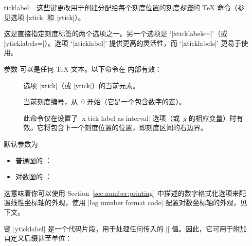 \begin{pgfplotsxykey}{\x ticklabel=}
    这些键更改用于创建分配给每个刻度位置的刻度\emph{标签}的 \TeX{} 命令（参见选项 |xtick| 和 |ytick|）。

    这是直接指定刻度标签的两个选项之一。另一个选项是 `|xticklabels=|'（或 |yticklabels=|）。选项 `|xticklabel|' 提供更高的灵活性，而 `|xticklabels|' 更易于使用。

    参数  可以是任何 \TeX{} 文本。以下命令在  内部有效：
    \begin{description}
        \item[] \declareandlabel{\tick} 选项 |xtick|（或 |ytick|）的当前元素。
        \item[] \declareandlabel{\ticknum} 当前刻度编号，从~0 开始（它是一个包含数字的宏）。
        \item[] \declareandlabel{\nexttick} 此命令仅在设置了 |x tick label as interval| 选项（或~$y$ 的相应变量）时有效。它将包含下一个刻度位置的位置，即刻度区间的右边界。
    \end{description}
    默认参数为
    \begin{itemize}
        \item 普通图的 \declareandlabel{\axisdefaultticklabel}：
\begin{codeexample}
\def\axisdefaultticklabel{$\pgfmathprintnumber{\tick}$}
\end{codeexample}
        \item 对数图的 \declareandlabel{\axisdefaultticklabellog}：
\begin{codeexample}
\def\axisdefaultticklabellog{%
    \pgfkeysgetvalue{/pgfplots/log number format code/.@cmd}\pgfplots@log@label@style
    \expandafter\pgfplots@log@label@style\tick\pgfeov
}
\end{codeexample}
    \end{itemize}
    这意味着你可以使用 Section~\ref{sec:number:printing} 中描述的数字格式化选项来配置线性坐标轴的外观，使用 |log number format code| 配置对数坐标轴的外观，见下文。

    \noindent 键 |yticklabel| 是一个代码片段，用于处理任何传入的 |\tick| 值。因此，它可用于附加自定义后缀甚至单位：
\begin{codeexample}[]
\end{codeexample}


\end{pgfplotsxykey}
